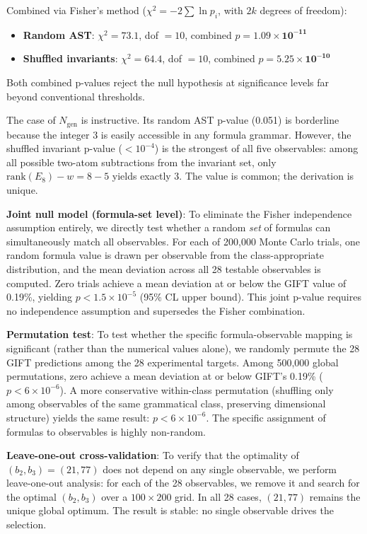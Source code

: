 \documentclass[11pt,a4paper]{article}
\newcommand{\E}{\mathrm{E}}
\newcommand{\Weyl}{w}
\newcommand{\rank}{\mathrm{rank}}
\def\E{E}%
\def\Weyl{w}%
\begin{document}
Combined via Fisher's method ($\chi^2 = -2 \sum \ln p_i$, with $2k$ degrees of freedom):

\begin{itemize}
\item \textbf{Random AST}: $\chi^2 = 73.1$, dof $= 10$, combined $p = \mathbf{1.09 \times 10^{-11}}$
\item \textbf{Shuffled invariants}: $\chi^2 = 64.4$, dof $= 10$, combined $p = \mathbf{5.25 \times 10^{-10}}$
\end{itemize}

Both combined p-values reject the null hypothesis at significance levels far beyond conventional thresholds.

The case of $N_{\mathrm{gen}}$ is instructive. Its random AST p-value (0.051) is borderline because the integer 3 is easily accessible in any formula grammar. However, the shuffled invariant p-value ($< 10^{-4}$) is the strongest of all five observables: among all possible two-atom subtractions from the invariant set, only $\rank(\E_8) - \Weyl = 8 - 5$ yields exactly 3. The value is common; the derivation is unique.

\textbf{Joint null model (formula-set level)}: To eliminate the Fisher independence assumption entirely, we directly test whether a random \textit{set} of formulas can simultaneously match all observables. For each of 200,000 Monte Carlo trials, one random formula value is drawn per observable from the class-appropriate distribution, and the mean deviation across all 28 testable observables is computed. Zero trials achieve a mean deviation at or below the GIFT value of 0.19\%, yielding $p < 1.5 \times 10^{-5}$ (95\% CL upper bound). This joint p-value requires no independence assumption and supersedes the Fisher combination.

\textbf{Permutation test}: To test whether the specific formula-observable mapping is significant (rather than the numerical values alone), we randomly permute the 28 GIFT predictions among the 28 experimental targets. Among 500,000 global permutations, zero achieve a mean deviation at or below GIFT's 0.19\% ($p < 6 \times 10^{-6}$). A more conservative within-class permutation (shuffling only among observables of the same grammatical class, preserving dimensional structure) yields the same result: $p < 6 \times 10^{-6}$. The specific assignment of formulas to observables is highly non-random.

\textbf{Leave-one-out cross-validation}: To verify that the optimality of $(b_2, b_3) = (21, 77)$ does not depend on any single observable, we perform leave-one-out analysis: for each of the 28 observables, we remove it and search for the optimal $(b_2, b_3)$ over a $100 \times 200$ grid. In all 28 cases, $(21, 77)$ remains the unique global optimum. The result is stable: no single observable drives the selection.
\end{document}
